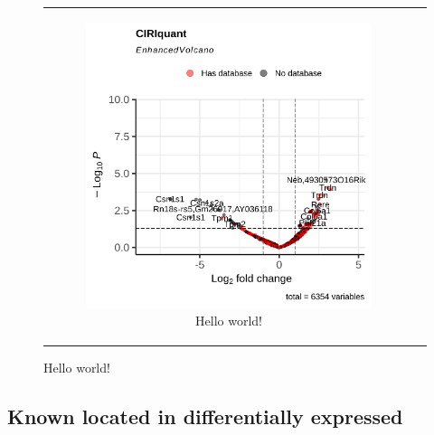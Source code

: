 \begin{figure}[H]
\begin{tabular}{cc}
\begin{subfigure}{0.5\textwidth}
            \includegraphics[width=\linewidth]{chapters/4_results_and_discussion/figures/dea/ciriquant/letrozole/volcano.png}
            \caption{Hello world!
            }
            \label{fig:letrozole_volcano_ciriquant}
        \end{subfigure} &

    \end{tabular}
    \caption{Hello world!
    }
    \label{fig:letrozole_volcano}
\end{figure}

\subsection{Known  located in differentially expressed
    }
